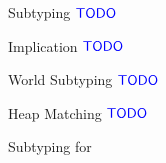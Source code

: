 \begin{figure*}[t]
\centering

\judgementHead
  {Subtyping}
  {$\textcolor{blue}{\textsf{{TODO}}}$}

\vsepRule

\judgementHead
  {Implication}
  {$\textcolor{blue}{\textsf{{TODO}}}$}

\vsepRule

\judgementHead
  {World Subtyping}
  {$\textcolor{blue}{\textsf{{TODO}}}$}

\vsepRule

\judgementHead
  {Heap Matching}
  {$\textcolor{blue}{\textsf{{TODO}}}$}

\vsepRule

\caption{Subtyping for \lang}
\end{figure*}
